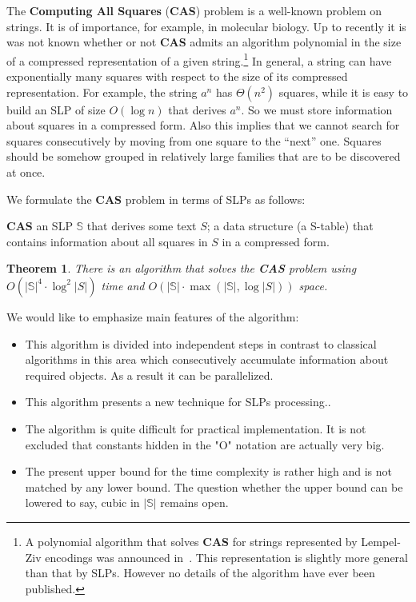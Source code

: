 ﻿\documentclass[11pt]{article}
\newtheorem{thm}{Theorem}
\newcommand{\slp}[1]{\mathbb{#1}}
\newcommand{\problem}[3]{
            \noindent {\sc Problem:} \textbf{#1} \newline
            \noindent {\sc Input:} #2 \newline
            \noindent {\sc Output:} #3
}
\begin{document}
The \textbf{Computing All Squares} (\textbf{CAS}) problem is a well-known problem on strings. It is of importance, for
example, in molecular biology. Up to recently it is was not known whether or not \textbf{CAS} admits an algorithm
polynomial in the size of a compressed representation of a given string.\footnote{A polynomial algorithm that solves
\textbf{CAS} for strings represented by Lempel-Ziv encodings was announced in~\cite{8}. This representation is slightly
more general than that by SLPs. However no details of the algorithm have ever been published.} In general, a string can
have exponentially many squares with respect to the size of its compressed representation. For example, the string
$a^n$ has $\Theta(n^2)$ squares, while it is easy to build an SLP of size $O(\log n)$ that derives $a^n$. So we must
store information about squares in a compressed form. Also this implies that we cannot search for squares consecutively
by moving from one square to the ``next'' one. Squares should be somehow grouped in relatively large families that are
to be discovered at once.

We formulate the \textbf{CAS} problem in terms of SLPs as follows:

\problem{CAS}{an SLP $\slp{S}$ that derives some text $S$;}{a data structure (a S-table) that contains
information about all squares in $S$ in a compressed form.}

\begin{thm}
There is an algorithm that solves the \textbf{CAS} problem using $O(|\slp{S}|^4 \cdot \log^2{|S|})$ time and
$O(|\slp{S}| \cdot \max(|\slp{S}|, \log{|S|}))$ space.
\end{thm}

We would like to emphasize main features of the algorithm:

\begin{itemize}
\item This algorithm is divided into independent steps in contrast to classical algorithms in this area which
consecutively accumulate information about required objects. As a result it can be parallelized.

\item This algorithm presents a new technique for SLPs processing..

\item The algorithm is quite difficult for practical implementation. It is not excluded that constants hidden in the
"O" notation are actually very big.

\item The present upper bound for the time complexity is rather high and is not matched by any lower bound. The question
whether the upper bound can be lowered to say, cubic in $|\mathbb{S}|$ remains open.
\end{itemize}

{\small 
	{}
	
}
\end{document}
